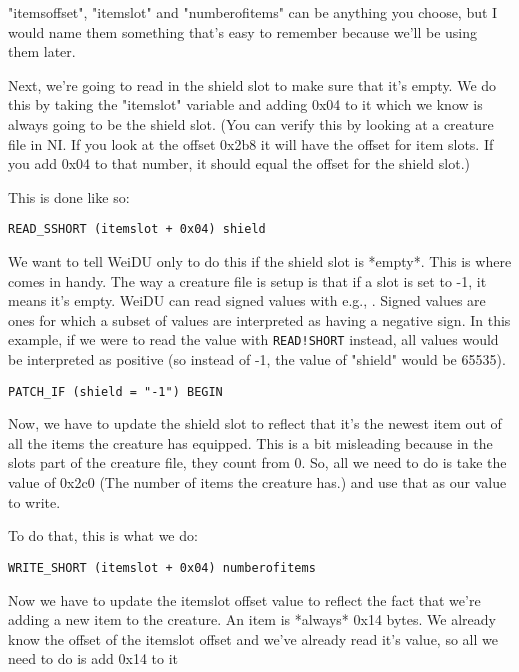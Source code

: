 \documentclass{article}
\def\ttref#1{\ahrefloc{#1}{\tt #1}}
\def\t#1{{\tt #1}}
\begin{document}
"itemsoffset", "itemslot" and "numberofitems" can be anything you choose, but I
would name them something that's easy to remember because we'll be using
them later.

Next, we're going to read in the shield slot to make sure that it's empty.
We do this by taking the "itemslot" variable and adding 0x04 to it which we
know is always going to be the shield slot.  (You can verify this by
looking at a creature file in NI.  If you look at the offset 0x2b8 it will
have the offset for item slots.  If you add 0x04 to that number, it should
equal the offset for the shield slot.)

This is done like so:

\begin{verbatim}
READ_SSHORT (itemslot + 0x04) shield
\end{verbatim}

We want to tell WeiDU only to do this if the shield slot is
*empty*.  This is where \ttref{PATCH!IF} comes in handy.  The way a creature
file is setup is that if a slot is set to -1, it means it's empty.  WeiDU can
read signed values with e.g., \ttref{READ!SSHORT}. Signed values are ones for
which a subset of values are interpreted as having a negative sign. In this
example, if we were to read the value with \t{READ!SHORT} instead, all values
would be interpreted as positive (so instead of -1, the value of "shield" would
be 65535).

\begin{verbatim}
PATCH_IF (shield = "-1") BEGIN
\end{verbatim}

Now, we have to update the shield slot to reflect that it's the newest item
out of all the items the creature has equipped.  This is a bit misleading
because in the slots part of the creature file, they count from 0.  So, all
we need to do is take the value of 0x2c0 (The number of items the creature
has.) and use that as our value to write.

To do that, this is what we do:

\begin{verbatim}
WRITE_SHORT (itemslot + 0x04) numberofitems
\end{verbatim}

Now we have to update the itemslot offset value to reflect the fact that
we're adding a new item to the creature.  An item is *always* 0x14 bytes.
We already know the offset of the itemslot offset and we've already read
it's value, so all we need to do is add 0x14 to it
\end{document}
